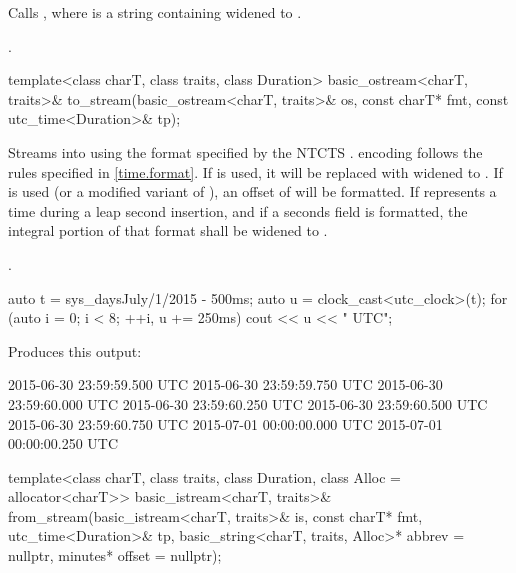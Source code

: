 \begin{itemdescr}
\pnum
\effects
Calls ,
where  is a string containing 
widened to .

\pnum
\returns {}.
\end{itemdescr}

%
\begin{itemdecl}
template<class charT, class traits, class Duration>
  basic_ostream<charT, traits>&
    to_stream(basic_ostream<charT, traits>& os, const charT* fmt, const utc_time<Duration>& tp);
\end{itemdecl}

\begin{itemdescr}
\pnum
\effects
Streams  into  using
the format specified by the NTCTS .
 encoding follows the rules specified in \ref{time.format}.
If  is used, it will be replaced with  widened to .
If  is used (or a modified variant of ),
an offset of  will be formatted.
If  represents a time during a leap second insertion,
and if a seconds field is formatted,
the integral portion of that format shall be  widened to .

\pnum
\returns {}.

\pnum
\begin{example}
\begin{codeblock}
auto t = sys_days{July/1/2015} - 500ms;
auto u = clock_cast<utc_clock>(t);
for (auto i = 0; i < 8; ++i, u += 250ms)
  cout << u << " UTC\n";
\end{codeblock}

Produces this output:

\begin{codeblock}
2015-06-30 23:59:59.500 UTC
2015-06-30 23:59:59.750 UTC
2015-06-30 23:59:60.000 UTC
2015-06-30 23:59:60.250 UTC
2015-06-30 23:59:60.500 UTC
2015-06-30 23:59:60.750 UTC
2015-07-01 00:00:00.000 UTC
2015-07-01 00:00:00.250 UTC
\end{codeblock}
\end{example}
\end{itemdescr}

%
\begin{itemdecl}
template<class charT, class traits, class Duration, class Alloc = allocator<charT>>
  basic_istream<charT, traits>&
    from_stream(basic_istream<charT, traits>& is, const charT* fmt,
                utc_time<Duration>& tp, basic_string<charT, traits, Alloc>* abbrev = nullptr,
                minutes* offset = nullptr);
\end{itemdecl}

